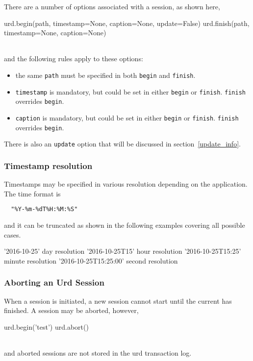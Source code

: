 There are a number of options associated with a session, as shown
here,
\\
\begin{python}
  urd.begin(path, timestamp=None, caption=None, update=False)
  urd.finish(path, timestamp=None, caption=None)
\end{python}
\\
and the following rules apply to these options:
\begin{itemize}
  \item the same \texttt{path} must be specified in both \texttt{begin} and \texttt{finish}.
  \item \texttt{timestamp} is mandatory, but could be set in either \texttt{begin} or
    \texttt{finish}.  \texttt{finish} overrides \texttt{begin}.
  \item \texttt{caption} is mandatory, but could be set in either \texttt{begin} or
    \texttt{finish}.  \texttt{finish} overrides \texttt{begin}.
\end{itemize}
There is also an \texttt{update} option that will be discussed in
section~\ref{update_info}.



\subsubsection{Timestamp resolution}

Timestamps may be specified in various resolution depending on the
application.  The time format is
\begin{verbatim}
  "%Y-%m-%dT%H:%M:%S"
\end{verbatim}
and it can be truncated as shown in the following examples covering all possible cases.
\\
\begin{python}
   '2016-10-25'               day resolution
   '2016-10-25T15'            hour resolution
   '2016-10-25T15:25'         minute resolution
   '2016-10-25T15:25:00'      second resolution
\end{python}



\subsubsection{Aborting an Urd Session}

When a session is initiated, a new session cannot start until the
current has finished.  A session may be aborted, however,
\\
\begin{python}
  urd.begin('test')
  urd.abort()
\end{python}
\\
and aborted sessions are not stored in the urd transaction log.



